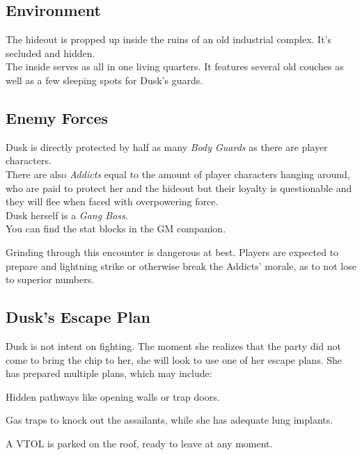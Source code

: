 \subsection*{Environment}
The hideout is propped up inside the ruins of an old industrial complex.
It's secluded and hidden.
\\%
The inside serves as all in one living quarters.
It features several old couches
	as well as a few sleeping spots for Dusk's guards.

\subsection*{Enemy Forces}
Dusk is directly protected by 
	half as many 
	\emph{Body Guards}
	as there are player characters.
	\\%
There are also
	\emph{Addicts}
	equal to the amount of player characters
	hanging around, who are paid to protect her and the hideout
	but their loyalty is questionable and they will flee when faced with overpowering force.
	\\%
Dusk herself is a \emph{Gang Boss}.
\\%
You can find the stat blocks in the GM companion.
\begin{exampleblock}
	Grinding through this encounter is dangerous at best.
	Players are expected to prepare
		and lightning strike
		or otherwise break the Addicts' morale,
		as to not lose to superior numbers.
\end{exampleblock}

\subsection*{Dusk's Escape Plan}
Dusk is not intent on fighting.
The moment she realizes that the party did not come to bring the chip to her,
	she will look to use one of her escape plans.
She has prepared multiple plans, which may include:
\begin{sitemize}
	\item Hidden pathways like opening walls or trap doors.
	\item Gas traps to knock out the assailants,
		while she has adequate lung implants.
	\item A VTOL is parked on the roof, ready to leave at any moment.
\end{sitemize}
